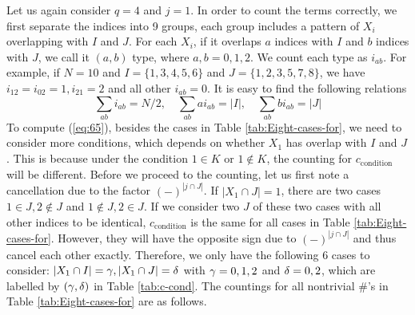 \documentclass[11pt]{article}
\renewcommand{\>}{\rangle}
\newcommand{\<}{\langle}
\begin{document}
Let us again consider $q=4$ and $j=1$. In order to count the terms
correctly, we first separate the indices into 9 groups, each group
includes a pattern of $X_{i}$ overlapping with $I$ and $J$. For
each $X_{i}$, if it overlaps $a$ indices with $I$ and $b$ indices
with $J$, we call it $(a,b)$ type, where $a,b=0,1,2$. We count
each type as $i_{ab}$. For example, if $N=10$ and $I=\{1,3,4,5,6\}$
and $J=\{1,2,3,5,7,8\}$, we have $i_{12}=i_{02}=1,i_{21}=2$ and
all other $i_{ab}=0$. It is easy to find the following relations
\begin{equation}
\sum_{ab}i_{ab}=N/2,\quad\sum_{ab}ai_{ab}=|I|,\quad\sum_{ab}bi_{ab}=|J|
\end{equation}
To compute (\ref{eq:65}), besides the cases in Table \ref{tab:Eight-cases-for},
we need to consider more conditions, which depends on whether $X_{1}$
has overlap with $I$ and $J$. This is because under the condition
$1\in K$ or $1\notin K$, the counting for $c_{\text{condition}}$
will be different. Before we proceed to the counting, let us first
note a cancellation due to the factor $(-)^{|j\cap J|}$. If $|X_{1}\cap J|=1$,
there are two cases $1\in J,2\notin J$ and $1\notin J,2\in J$. If
we consider two $J$ of these two cases with all other indices to
be identical, $c_{\text{condition}}$ is the same for all cases in
Table \ref{tab:Eight-cases-for}. However, they will have the opposite sign due to $(-)^{|j\cap J|}$ and thus cancel each other exactly.
Therefore, we only have the following 6 cases to consider: $|X_{1}\cap I|=\gamma,|X_{1}\cap J|=\delta$
with $\gamma=0,1,2$ and $\delta=0,2$, which are labelled by $(\gamma,\delta)$ in
Table \ref{tab:c-cond}. The countings for all nontrivial \#'s in
Table \ref{tab:Eight-cases-for} are as follows.
\end{document}
